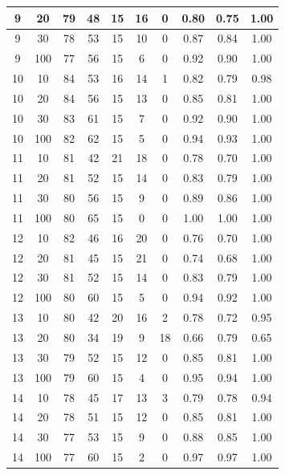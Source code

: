 \begin{longtable}{ |c|c|c|c|c|c|c|c|c|c| }
            9 & 20 & 79 & 48 & 15 & 16 & 0 & 0.80 & 0.75 & 1.00 \\ \hline
            9 & 30 & 78 & 53 & 15 & 10 & 0 & 0.87 & 0.84 & 1.00 \\ \hline
            9 & 100 & 77 & 56 & 15 & 6 & 0 & 0.92 & 0.90 & 1.00 \\ \hline
            10 & 10 & 84 & 53 & 16 & 14 & 1 & 0.82 & 0.79 & 0.98 \\ \hline
            10 & 20 & 84 & 56 & 15 & 13 & 0 & 0.85 & 0.81 & 1.00 \\ \hline
            10 & 30 & 83 & 61 & 15 & 7 & 0 & 0.92 & 0.90 & 1.00 \\ \hline
            10 & 100 & 82 & 62 & 15 & 5 & 0 & 0.94 & 0.93 & 1.00 \\ \hline
            11 & 10 & 81 & 42 & 21 & 18 & 0 & 0.78 & 0.70 & 1.00 \\ \hline
            11 & 20 & 81 & 52 & 15 & 14 & 0 & 0.83 & 0.79 & 1.00 \\ \hline
            11 & 30 & 80 & 56 & 15 & 9 & 0 & 0.89 & 0.86 & 1.00 \\ \hline
            11 & 100 & 80 & 65 & 15 & 0 & 0 & 1.00 & 1.00 & 1.00 \\ \hline
            12 & 10 & 82 & 46 & 16 & 20 & 0 & 0.76 & 0.70 & 1.00 \\ \hline
            12 & 20 & 81 & 45 & 15 & 21 & 0 & 0.74 & 0.68 & 1.00 \\ \hline
            12 & 30 & 81 & 52 & 15 & 14 & 0 & 0.83 & 0.79 & 1.00 \\ \hline
            12 & 100 & 80 & 60 & 15 & 5 & 0 & 0.94 & 0.92 & 1.00 \\ \hline
            13 & 10 & 80 & 42 & 20 & 16 & 2 & 0.78 & 0.72 & 0.95 \\ \hline
            13 & 20 & 80 & 34 & 19 & 9 & 18 & 0.66 & 0.79 & 0.65 \\ \hline
            13 & 30 & 79 & 52 & 15 & 12 & 0 & 0.85 & 0.81 & 1.00 \\ \hline
            13 & 100 & 79 & 60 & 15 & 4 & 0 & 0.95 & 0.94 & 1.00 \\ \hline
            14 & 10 & 78 & 45 & 17 & 13 & 3 & 0.79 & 0.78 & 0.94 \\ \hline
            14 & 20 & 78 & 51 & 15 & 12 & 0 & 0.85 & 0.81 & 1.00 \\ \hline
            14 & 30 & 77 & 53 & 15 & 9 & 0 & 0.88 & 0.85 & 1.00 \\ \hline
            14 & 100 & 77 & 60 & 15 & 2 & 0 & 0.97 & 0.97 & 1.00 \\ \hline

\end{longtable}
